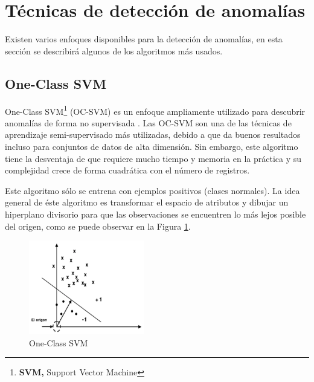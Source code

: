 \section{T\'{e}cnicas de detecci\'{o}n de anomal\'{i}as}

Existen varios enfoques disponibles para la detección de anomalías, en esta secci\'{o}n se describir\'{a} algunos de los algoritmos m\'{a}s usados.

\subsection{One-Class SVM}

One-Class SVM\footnote{\textbf{SVM, }Support Vector Machine} (OC-SVM) es un enfoque ampliamente utilizado para descubrir anomal\'{i}as de forma no supervisada \cite{59}. Las OC-SVM son una de las técnicas de aprendizaje semi-supervisado más utilizadas, debido a que da buenos resultados incluso para conjuntos de datos de alta dimensión. Sin embargo, este algoritmo tiene la desventaja de que requiere mucho tiempo y memoria en la práctica y su complejidad crece de forma cuadrática con el número de registros.

\vspace{5mm} %

Este algoritmo s\'{o}lo se entrena con ejemplos positivos (clases normales). La idea general de \'{e}ste algoritmo es transformar el espacio de atributos y dibujar un hiperplano divisorio para que las observaciones se encuentren lo m\'{a}s lejos posible del origen, como se puede observar en la Figura \ref{fig:oc-svm}.

\begin{figure}[h!]
  \begin{center}	\includegraphics[width=0.45\textwidth]{imagenes/Cap4/oc-svm}
  \caption{One-Class SVM} 
  \label{fig:oc-svm}
  \end{center}
\end{figure}

\vspace{5mm} %

